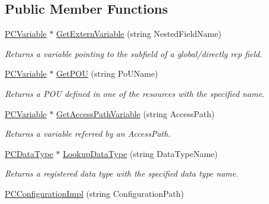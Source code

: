 \subsection*{Public Member Functions}
\begin{DoxyCompactItemize}
\item 
\hyperlink{classpc__emulator_1_1PCVariable}{P\+C\+Variable} $\ast$ \hyperlink{classpc__emulator_1_1PCConfigurationImpl_af21b258249c8e208e658f320dced677d}{Get\+Extern\+Variable} (string Nested\+Field\+Name)\hypertarget{classpc__emulator_1_1PCConfigurationImpl_af21b258249c8e208e658f320dced677d}{}\label{classpc__emulator_1_1PCConfigurationImpl_af21b258249c8e208e658f320dced677d}

\begin{DoxyCompactList}\small\item\em Returns a variable pointing to the subfield of a global/directly rep field. \end{DoxyCompactList}\item 
\hyperlink{classpc__emulator_1_1PCVariable}{P\+C\+Variable} $\ast$ \hyperlink{classpc__emulator_1_1PCConfigurationImpl_ae62ce7358d79b2695bd969d163cae7b7}{Get\+P\+OU} (string Po\+U\+Name)
\begin{DoxyCompactList}\small\item\em Returns a P\+OU defined in one of the resources with the specified name. \end{DoxyCompactList}\item 
\hyperlink{classpc__emulator_1_1PCVariable}{P\+C\+Variable} $\ast$ \hyperlink{classpc__emulator_1_1PCConfigurationImpl_a2d75e4ba41a54ced47134ac9b7a873a8}{Get\+Access\+Path\+Variable} (string Access\+Path)
\begin{DoxyCompactList}\small\item\em Returns a variable referred by an Access\+Path. \end{DoxyCompactList}\item 
\hyperlink{classpc__emulator_1_1PCDataType}{P\+C\+Data\+Type} $\ast$ \hyperlink{classpc__emulator_1_1PCConfigurationImpl_abad943ac691a001ec5606d9d69aa6a0d}{Lookup\+Data\+Type} (string Data\+Type\+Name)
\begin{DoxyCompactList}\small\item\em Returns a registered data type with the specified data type name. \end{DoxyCompactList}\item 
\hyperlink{classpc__emulator_1_1PCConfigurationImpl_a43cbbf707440d2e928c4048afca1fe95}{P\+C\+Configuration\+Impl} (string Configuration\+Path)

\end{DoxyCompactItemize}
